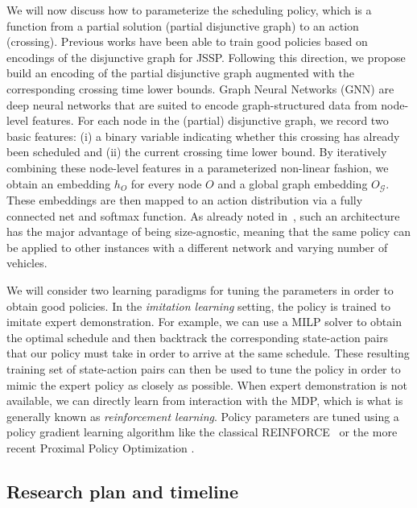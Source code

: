 \documentclass{article}
\theoremstyle{definition}
\theoremstyle{plain}
\begin{document}
We will now discuss how to parameterize the scheduling policy, which is a
function from a partial solution (partial disjunctive graph) to an action
(crossing).
Previous works have been able to train good policies based on encodings of the
disjunctive graph for JSSP. Following this direction, we propose build
an encoding of the partial disjunctive graph augmented with the corresponding
crossing time lower bounds.
%
Graph Neural Networks (GNN) are deep neural networks that are suited to encode
graph-structured data from node-level features. For each node in the (partial)
disjunctive graph, we record two basic features: (i) a binary variable
indicating whether this crossing has already been scheduled and (ii) the current
crossing time lower bound. By iteratively combining these node-level features in
a parameterized non-linear fashion, we obtain an embedding $h_{O}$ for every
node $O$ and a global graph embedding $O_{\mathcal{G}}$. These embeddings are
then mapped to an action distribution via a fully connected net and softmax
function.
As already noted in~\cite{zhangLearningDispatchJob2020}, such an architecture has the major advantage of being
size-agnostic, meaning that the same policy can be applied to other instances
with a different network and varying number of vehicles.

We will consider two learning paradigms for tuning the parameters in order to
obtain good policies. In the \textit{imitation learning} setting, the policy is
trained to imitate expert demonstration. For example, we can use a MILP solver
to obtain the optimal schedule and then backtrack the corresponding state-action
pairs that our policy must take in order to arrive at the same schedule. These
resulting training set of state-action pairs can then be used to tune the policy
in order to mimic the expert policy as closely as possible.
When expert demonstration is not available, we can directly learn from
interaction with the MDP, which is what is generally known as \textit{reinforcement
  learning}. Policy parameters are tuned using a policy gradient
learning algorithm like the classical REINFORCE~\cite{10.1007/BF00992696} or the
more recent Proximal Policy Optimization
\cite{schulmanProximalPolicyOptimization2017}.


\subsection{Research plan and timeline}
\end{document}
